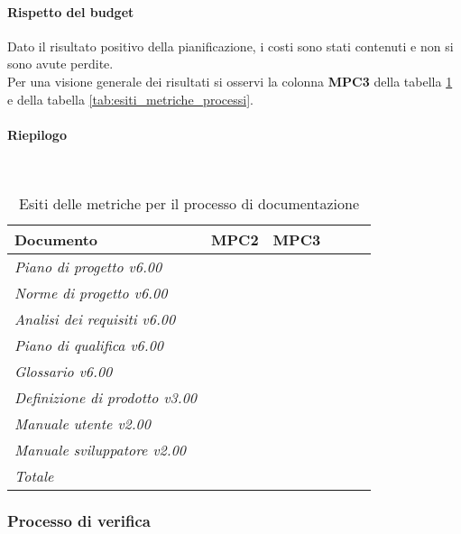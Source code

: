 \documentclass[../PianoDiQualifica.tex]{subfiles}
\begin{document}
\begin{appendices}
			\paragraph{Rispetto del budget}
			Dato il risultato positivo della pianificazione, i costi sono stati contenuti  e non si sono avute perdite.\\
			Per una visione generale dei risultati si osservi la colonna \textbf{MPC3}  della tabella \ref{tab:esiti_metriche_per_il_processo_di_documentazione} e della tabella \ref{tab:esiti_metriche_processi}.
			
			\paragraph{Riepilogo}\
			\begin{table}[H]
				\centering
				\begin{tabular}{l * {5}{c}}
					\toprule
					\textbf{Documento} & \textbf{MPC2} & \textbf{MPC3}\\
					\midrule
					\textit{Piano di progetto v6.00}  & \color{dkgreen}{0\%} & \color{dkgreen}{0\%} \\
					\textit{Norme di progetto v6.00}  & \color{dkgreen}{0\%} & \color{dkgreen}{0\%} \\
					\textit{Analisi dei requisiti v6.00}  & \color{dkgreen}{0\%} & \color{dkgreen}{0\%} \\
					\textit{Piano di qualifica v6.00}  & \color{dkgreen}{0\%} & \color{dkgreen}{0\%} \\
					\textit{Glossario v6.00}  & \color{dkgreen}{0\%} & \color{dkgreen}{0\%} \\
					\textit{Definizione di prodotto v3.00}  & \color{dkgreen}{0\%} & \color{dkgreen}{0\%} \\
					\textit{Manuale utente v2.00}  & \color{dkgreen}{0\%} & \color{dkgreen}{0\%} \\
					\textit{Manuale sviluppatore v2.00}  & \color{dkgreen}{0\%} & \color{dkgreen}{0\%} \\
					\textit{Totale} & \color{dkgreen}{0\%} & \color{dkgreen}{0\%} \\
					\bottomrule
				\end{tabular}
				\caption{Esiti delle metriche per il processo di documentazione}
				\label{tab:esiti_metriche_per_il_processo_di_documentazione}
			\end{table}
						
		\subsubsection{Processo di verifica}

\end{appendices}
\end{document}
